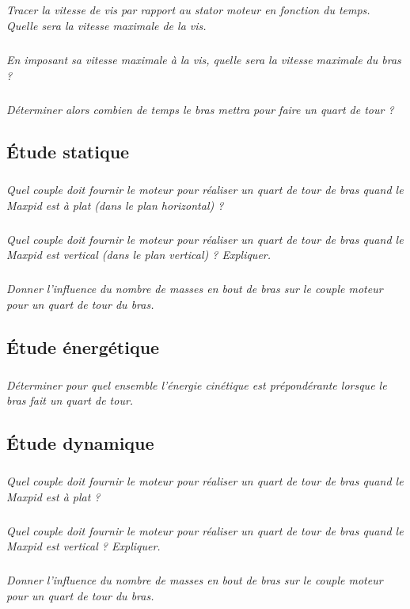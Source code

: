 \documentclass[10pt,fleqn]{article} %
\begin{document}
\begin{multicols}{2}
\subparagraph{}\textit{Tracer la vitesse de vis par rapport au stator moteur en fonction du temps. Quelle sera la vitesse maximale de la vis.}

\subparagraph{}\textit{En imposant sa vitesse maximale à la vis, quelle sera la vitesse maximale du bras ?}

\subparagraph{}\textit{Déterminer alors combien de temps le bras mettra pour faire un quart de tour ?}


\subsection*{Étude statique}

\subparagraph{}\textit{Quel couple doit fournir le moteur pour réaliser un quart de tour de bras quand le Maxpid est à plat (dans le plan horizontal) ?}

\subparagraph{}\textit{Quel couple doit fournir le moteur pour réaliser un quart de tour de bras quand le Maxpid est vertical (dans le plan vertical) ? Expliquer.}

\subparagraph{}\textit{Donner l'influence du nombre de masses en bout de bras sur le couple moteur pour un quart de tour du bras.}


\subsection*{Étude énergétique}

\subparagraph{}\textit{Déterminer pour quel ensemble l'énergie cinétique est prépondérante lorsque le bras fait un quart de tour.}


\subsection*{Étude dynamique}


\subparagraph{}\textit{Quel couple doit fournir le moteur pour réaliser un quart de tour de bras quand le Maxpid est à plat ?}

\subparagraph{}\textit{Quel couple doit fournir le moteur pour réaliser un quart de tour de bras quand le Maxpid est vertical ? Expliquer.}

\subparagraph{}\textit{Donner l'influence du nombre de masses en bout de bras sur le couple moteur pour un quart de tour du bras.}

\end{multicols}
\end{document}
